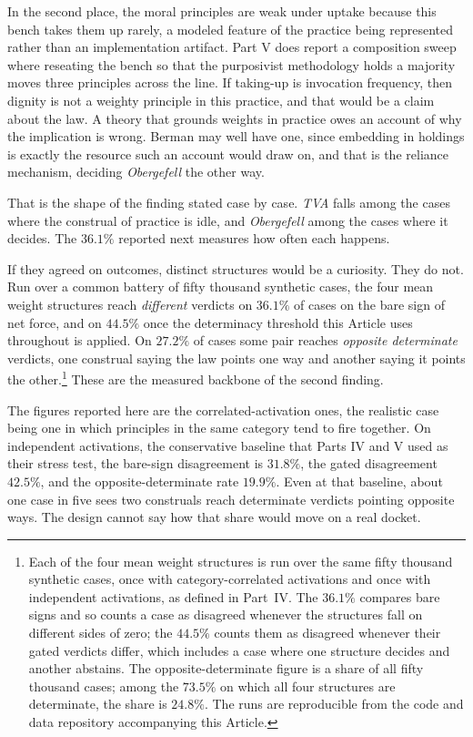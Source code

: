 In the second place, the moral principles are weak under uptake because
this bench takes them up rarely, a modeled feature of the practice
being represented rather than an implementation artifact. Part V does
report a composition sweep where reseating the bench so that the
purposivist methodology holds a majority moves three principles across the
line. If taking-up is invocation frequency, then dignity is not a weighty
principle in this practice, and that would be a claim about the law. A
theory that grounds weights in practice owes an account of why the
implication is wrong. Berman may well have one, since embedding in
holdings is exactly the resource such an account would draw on, and that
is the reliance mechanism, deciding \textit{Obergefell} the other
way.

That is the shape of the finding stated case by case. \textit{TVA} falls
among the cases where the construal of practice is idle, and
\textit{Obergefell} among the cases where it decides. The $36.1\%$
reported next measures how often each happens.

If they agreed on outcomes, distinct structures would be a curiosity. They
do not. Run over a common battery of fifty thousand synthetic cases, the four mean
weight structures reach \textit{different} verdicts on $36.1\%$ of cases on
the bare sign of net force, and on $44.5\%$ once the determinacy threshold this
Article uses throughout is applied. On $27.2\%$ of cases some pair reaches
\textit{opposite determinate} verdicts, one construal saying the law points
one way and another saying it points the other.\footnote{Each of the four mean
weight structures is run over the same fifty thousand synthetic cases, once
with category-correlated activations and once with independent activations, as
defined in Part~IV. The $36.1\%$ compares bare signs and so counts a case as
disagreed whenever the structures fall on different sides of zero; the
$44.5\%$ counts them as disagreed whenever their gated verdicts differ, which
includes a case where one structure decides and another abstains. The
opposite-determinate figure is a share of all fifty thousand cases; among the
$73.5\%$ on which all four structures are determinate, the share is $24.8\%$.
The runs are reproducible from the code and data repository accompanying this
Article.} These are the measured backbone of the second finding.

The figures reported here are the correlated-activation ones, the realistic
case being one in which principles in the same category tend to fire together.
On independent activations, the conservative baseline that Parts IV and V used as
their stress test, the bare-sign disagreement is $31.8\%$, the gated
disagreement $42.5\%$, and the opposite-determinate rate $19.9\%$. Even at that
baseline, about one case in five sees two construals reach determinate verdicts
pointing opposite ways. The design cannot say how that share would move on a
real docket.

